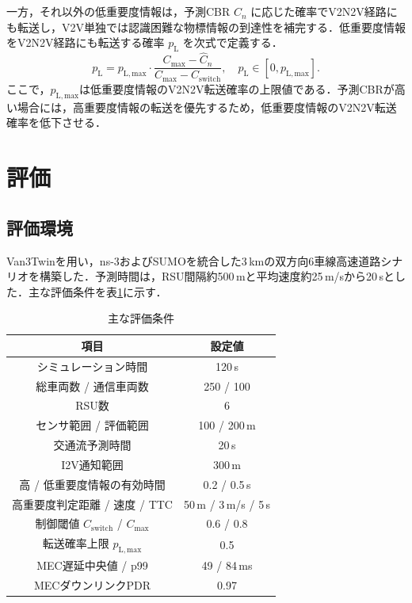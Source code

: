 \documentclass{fitj}
\begin{document}
一方，それ以外の低重要度情報は，予測CBR $\hat{C}_{n}$ に応じた確率でV2N2V経路にも転送し，V2V単独では認識困難な物標情報の到達性を補完する．低重要度情報をV2N2V経路にも転送する確率 $p_{\mathrm{L}}$ を次式で定義する．
\begin{equation}
p_{\mathrm{L}} =
p_{\mathrm{L,max}}
\cdot
\frac{C_{\max}-\hat{C}_{n}}
     {C_{\max}-C_{\mathrm{switch}}},
\quad
p_{\mathrm{L}} \in [0,p_{\mathrm{L,max}}].
\end{equation}
ここで，$p_{\mathrm{L,max}}$は低重要度情報のV2N2V転送確率の上限値である．予測CBRが高い場合には，高重要度情報の転送を優先するため，低重要度情報のV2N2V転送確率を低下させる．

\section{評価}

\subsection{評価環境}
Van3Twinを用い，ns-3およびSUMOを統合した3\,kmの双方向6車線高速道路シナリオを構築した．予測時間は，RSU間隔約500\,mと平均速度約25\,m/sから20\,sとした．主な評価条件を表\ref{tab:condition}に示す．

\begin{table}[t]
\centering
\caption{主な評価条件}
\label{tab:condition}
\small
\begin{tabular}{cc}
\hline
項目 & 設定値 \\ \hline \hline
シミュレーション時間 & 120\,s \\
総車両数 / 通信車両数 & 250 / 100 \\
RSU数 & 6 \\
センサ範囲 / 評価範囲 & 100 / 200\,m \\
交通流予測時間 & 20\,s \\
I2V通知範囲 & 300\,m \\
高 / 低重要度情報の有効時間 & 0.2 / 0.5\,s \\
高重要度判定距離 / 速度 / TTC & 50\,m / 3\,m/s / 5\,s \\
制御閾値 $C_{\mathrm{switch}}$ / $C_{\max}$ & 0.6 / 0.8 \\
転送確率上限 $p_{\mathrm{L,max}}$ & 0.5 \\
MEC遅延中央値 / p99 & 49 / 84\,ms \\
MECダウンリンクPDR & 0.97 \\ \hline
\end{tabular}
\end{table}
\end{document}
